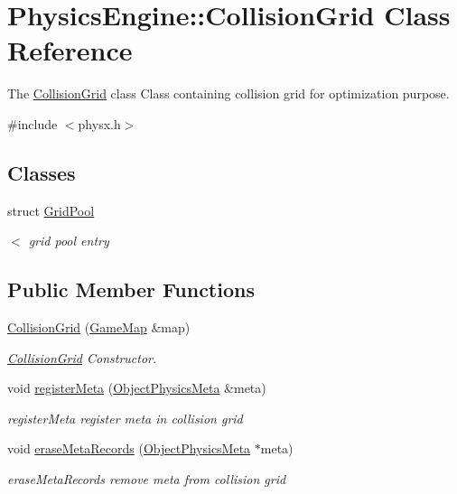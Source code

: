 \hypertarget{classPhysicsEngine_1_1CollisionGrid}{}\section{Physics\+Engine\+:\+:Collision\+Grid Class Reference}
\label{classPhysicsEngine_1_1CollisionGrid}


The \hyperlink{classPhysicsEngine_1_1CollisionGrid}{Collision\+Grid} class Class containing collision grid for optimization purpose.  




{\ttfamily \#include $<$physx.\+h$>$}

\subsection*{Classes}
\begin{DoxyCompactItemize}
\item 
struct \hyperlink{structPhysicsEngine_1_1CollisionGrid_1_1GridPool}{Grid\+Pool}
\begin{DoxyCompactList}\small\item\em $<$ grid pool entry \end{DoxyCompactList}\end{DoxyCompactItemize}
\subsection*{Public Member Functions}
\begin{DoxyCompactItemize}
\item 
\hyperlink{classPhysicsEngine_1_1CollisionGrid_a825fc5e0aaaf4eb9f663b957257ad804}{Collision\+Grid} (\hyperlink{classGameMap}{Game\+Map} \&map)
\begin{DoxyCompactList}\small\item\em \hyperlink{classPhysicsEngine_1_1CollisionGrid}{Collision\+Grid} Constructor. \end{DoxyCompactList}\item 
void \hyperlink{classPhysicsEngine_1_1CollisionGrid_aa82df2da2bcb18cd943e3f68c2099a42}{register\+Meta} (\hyperlink{classObjectPhysicsMeta}{Object\+Physics\+Meta} \&meta)
\begin{DoxyCompactList}\small\item\em register\+Meta register meta in collision grid \end{DoxyCompactList}\item 
void \hyperlink{classPhysicsEngine_1_1CollisionGrid_aef5fff9dd08c6adb65f4437536883da6}{erase\+Meta\+Records} (\hyperlink{classObjectPhysicsMeta}{Object\+Physics\+Meta} $\ast$meta)
\begin{DoxyCompactList}\small\item\em erase\+Meta\+Records remove meta from collision grid \end{DoxyCompactList}\end{DoxyCompactItemize}
